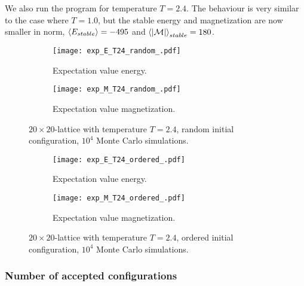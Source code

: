\documentclass[11pt]{article}
\begin{document}
\begin{flushleft}
We also run the program for temperature $T=2.4$. The behaviour is very similar to the case where $T=1.0$, but the stable energy and magnetization are now smaller in norm, $\braket{E_{stable}}= -495$ and $\braket{|\mathcal{M}|}_{stable} = 180$. 

\begin{figure}[H]
\centering
\begin{subfigure}{.5\textwidth}
  \centering
  \texttt{[image: exp\_E\_T24\_random\_.pdf]}
  \caption{Expectation value energy.}
  \label{fig:sub1}
\end{subfigure}%
\begin{subfigure}{.5\textwidth}
  \centering
  \texttt{[image: exp\_M\_T24\_random\_.pdf]}
  \caption{Expectation value magnetization.}
  \label{fig:sub2}
\end{subfigure}
\caption{$20 \times 20$-lattice with temperature $T=2.4$, random initial configuration, $10^4$ Monte Carlo simulations.}
\label{fig:cms-EM T=2.4 random}
\end{figure}


\begin{figure}[H]
\centering
\begin{subfigure}{.5\textwidth}
  \centering
  \texttt{[image: exp\_E\_T24\_ordered\_.pdf]}
  \caption{Expectation value energy.}
  \label{fig:sub1}
\end{subfigure}%
\begin{subfigure}{.5\textwidth}
  \centering
  \texttt{[image: exp\_M\_T24\_ordered\_.pdf]}
  \caption{Expectation value magnetization.}
  \label{fig:sub2}
\end{subfigure}
\caption{$20 \times 20$-lattice with temperature $T=2.4$, ordered initial configuration, $10^4$ Monte Carlo simulations.}
\label{fig:cms-EM T=2.4 random}
\end{figure}
\end{flushleft}

\subsubsection{Number of accepted configurations}
\end{document}
